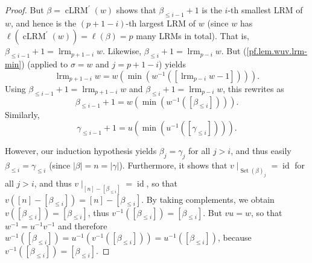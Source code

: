 \documentclass[10pt,a4paper]{amsart}
\newcommand{\id}{\operatorname{id}} %
\newcommand{\tup}[1]{\left( #1 \right)}
\begin{document}
\begin{proof}
But $\beta=\operatorname{cLRM}^{\prime}\left(  w\right)  $ shows that
$\beta_{\leq i-1}+1$ is the $i$-th smallest LRM of $w$, and hence is the
$\left(  p+1-i\right)  $-th largest LRM of $w$ (since $w$ has $\ell\left(
\operatorname{cLRM}^{\prime}(w)\right)  =\ell\tup{\beta} = p$
many LRMs in total). That is,
$\beta_{\leq i-1}+1=\operatorname*{lrm}\nolimits_{p+1-i}w$. Likewise,
$\beta_{\leq i}+1=\operatorname*{lrm}\nolimits_{p-i}w$. But
(\ref{pf.lem.wuv.lrm-min}) (applied to $\sigma=w$ and $j=p+1-i$) yields
\[
\operatorname*{lrm}\nolimits_{p+1-i}w=w\left(  \min\left(  w^{-1}\left(
\left[  \operatorname*{lrm}\nolimits_{p-i}w-1\right]  \right)  \right)
\right)  .
\]
Using $\beta_{\leq i-1}+1=\operatorname*{lrm}\nolimits_{p+1-i}w$ and
$\beta_{\leq i}+1=\operatorname*{lrm}\nolimits_{p-i}w$, this rewrites as%
\begin{equation}
\beta_{\leq i-1}+1=w\left(  \min\left(  w^{-1}\left(  \left[  \beta_{\leq
i}\right]  \right)  \right)  \right)  .\label{pf.lem.wuv.4b}%
\end{equation}
Similarly,%
\begin{equation}
\gamma_{\leq i-1}+1=u\left(  \min\left(  u^{-1}\left(  \left[  \gamma_{\leq
i}\right]  \right)  \right)  \right)  .\label{pf.lem.wuv.4g}%
\end{equation}

However, our induction hypothesis yields $\beta_{j}=\gamma_{j}$ for all $j>i$,
and thus easily $\beta_{\leq i}=\gamma_{\leq i}$ (since $\left\vert
\beta\right\vert =n=\left\vert \gamma\right\vert $). Furthermore, it shows
that $\left. v\mid_{\operatorname*{Set}\left(  \beta\right)  _{j}} \right.
= \id $ for all $j>i$, and thus
$\left. v\mid_{\left[  n\right]  -\left[  \beta_{\leq
i}\right]  }\right. = \id $,
so that
$v\tup{\left[  n\right]  -\left[  \beta_{\leq
i}\right]} = \left[  n\right]  -\left[  \beta_{\leq
i}\right]$.
By taking complements, we obtain
$v\tup{\left[  \beta_{\leq i}\right]} = \left[  \beta_{\leq i}\right]$,
thus
$v^{-1}\tup{\left[  \beta_{\leq i}\right]} = \left[  \beta_{\leq i}\right]$.
But $vu = w$, so that $w^{-1}=u^{-1}v^{-1}$ and therefore
$w^{-1}\left( \left[  \beta_{\leq i}\right]  \right)
= u^{-1}\left( v^{-1} \left( \left[  \beta_{\leq i}\right]  \right)\right)
= u^{-1}\left(  \left[  \beta_{\leq i}\right]  \right)  $,
because
$v^{-1}\tup{\left[  \beta_{\leq i}\right]} = \left[  \beta_{\leq i}\right]$.


\end{proof}
\end{document}
